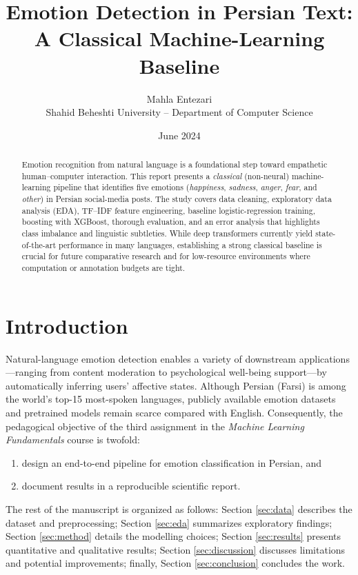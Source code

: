 \documentclass[12pt]{article}
\title{\textbf{Emotion Detection in Persian Text:\\
A Classical Machine-Learning Baseline}}
\author{Mahla Entezari\\\small Shahid Beheshti University – Department of Computer Science}
\date{June 2024}
\begin{document}
\maketitle
\vspace*{-1.0em}
\begin{abstract}
\noindent
Emotion recognition from natural language is a foundational step toward empathetic human–computer interaction.  
This report presents a \emph{classical} (non-neural) machine-learning pipeline that identifies five emotions
(\textit{happiness}, \textit{sadness}, \textit{anger}, \textit{fear}, and \textit{other})
in Persian social-media posts.  
The study covers data cleaning, exploratory data analysis (EDA), TF–IDF feature engineering, baseline logistic-regression training,
boosting with XGBoost, thorough evaluation, and an error analysis that highlights class imbalance and linguistic subtleties.
While deep transformers currently yield state-of-the-art performance in many languages, establishing a strong classical baseline
is crucial for future comparative research and for low-resource environments where computation or annotation budgets are tight.
\end{abstract}

\section{Introduction}
Natural-language emotion detection enables a variety of downstream applications—ranging from content moderation
to psychological well-being support—by automatically inferring users’ affective states.
Although Persian (Farsi) is among the world’s top-15 most-spoken languages, publicly available emotion datasets and pretrained models remain scarce compared with English.
Consequently, the pedagogical objective of the third assignment in the \textit{Machine Learning Fundamentals} course is twofold:
\begin{enumerate}[label=(\roman*)]
  \item design an end-to-end pipeline for emotion classification in Persian, and
  \item document results in a reproducible scientific report.
\end{enumerate}

The rest of the manuscript is organized as follows:
Section \ref{sec:data} describes the dataset and preprocessing;
Section \ref{sec:eda} summarizes exploratory findings;
Section \ref{sec:method} details the modelling choices;
Section \ref{sec:results} presents quantitative and qualitative results;
Section \ref{sec:discussion} discusses limitations and potential improvements;
finally, Section \ref{sec:conclusion} concludes the work.
\end{document}
